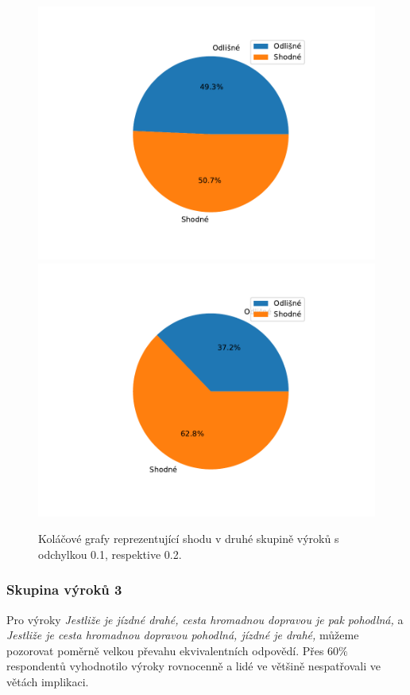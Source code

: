     \begin{figure}[H]
    \caption{Koláčové grafy reprezentující shodu v druhé skupině výrok\r u s odchylkou 0.1, respektive 0.2.}
                \includegraphics[scale=0.5]{template-fig/group1.pdf}
                \includegraphics[scale=0.5]{template-fig/group11.pdf}
            \end{figure}
\subsubsection{Skupina výrok\r u 3}
Pro výroky \textit{\clqq Jestliže je jízdné drahé, cesta hromadnou dopravou je pak pohodlná,\crqq } \space a \textit{\clqq Jestliže je cesta hromadnou dopravou pohodlná, jízdné je drahé,\crqq } \space m\r užeme pozorovat poměrně velkou převahu ekvivalentních odpovědí. Přes $60 $\space$ \%$ respondent\r u vyhodnotilo výroky rovnocenně a lidé ve většině nespatřovali ve větách implikaci.



